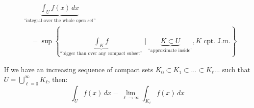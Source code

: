 \begin{math-stroke}
\begin{align*}
&\underbrace{\int_U f(x) \, dx}_{\text{``integral over the whole open set''}} \\
&\quad = \sup \left\{ \underbrace{\int_K f}_{\text{``bigger than over any compact subset''}} \mid \underbrace{K \subset U}_{\text{``approximate inside''}}, K \text{ cpt. J.m.} \right\}
\end{align*}
\end{math-stroke}

\begin{orange-formula}
\begin{proposition}
If we have an increasing sequence of compact sets $K_0 \subset K_1 \subset \dots \subset K_\ell \dots$ such that $U = \bigcup_{\ell=0}^\infty K_\ell$, then:
\[
\int_U f(x) \, dx = \lim_{\ell \to \infty} \int_{K_\ell} f(x) \, dx
\]
\end{proposition}
\end{orange-formula}

